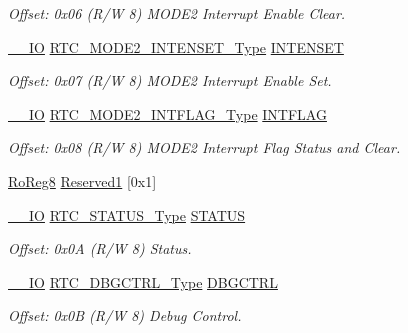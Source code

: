 \begin{DoxyCompactItemize}
\begin{DoxyCompactList}\small\item\em Offset\+: 0x06 (R/W 8) M\+O\+D\+E2 Interrupt Enable Clear. \end{DoxyCompactList}\item 
\mbox{\hyperlink{core__cm0plus_8h_aec43007d9998a0a0e01faede4133d6be}{\+\_\+\+\_\+\+IO}} \mbox{\hyperlink{union_r_t_c___m_o_d_e2___i_n_t_e_n_s_e_t___type}{R\+T\+C\+\_\+\+M\+O\+D\+E2\+\_\+\+I\+N\+T\+E\+N\+S\+E\+T\+\_\+\+Type}} \mbox{\hyperlink{struct_rtc_mode2_a80f57e7f64955acb2e16970997fa5d7f}{I\+N\+T\+E\+N\+S\+ET}}
\begin{DoxyCompactList}\small\item\em Offset\+: 0x07 (R/W 8) M\+O\+D\+E2 Interrupt Enable Set. \end{DoxyCompactList}\item 
\mbox{\hyperlink{core__cm0plus_8h_aec43007d9998a0a0e01faede4133d6be}{\+\_\+\+\_\+\+IO}} \mbox{\hyperlink{union_r_t_c___m_o_d_e2___i_n_t_f_l_a_g___type}{R\+T\+C\+\_\+\+M\+O\+D\+E2\+\_\+\+I\+N\+T\+F\+L\+A\+G\+\_\+\+Type}} \mbox{\hyperlink{struct_rtc_mode2_a98dc62afc11df4cca24babb393af06dc}{I\+N\+T\+F\+L\+AG}}
\begin{DoxyCompactList}\small\item\em Offset\+: 0x08 (R/W 8) M\+O\+D\+E2 Interrupt Flag Status and Clear. \end{DoxyCompactList}\item 
\mbox{\hyperlink{group___s_a_m_d21_e15_a__definitions_ga0d957f1433aaf5d70e4dc2b68288442d}{Ro\+Reg8}} \mbox{\hyperlink{struct_rtc_mode2_a092866123ac46d0985136e4dca2f36f4}{Reserved1}} \mbox{[}0x1\mbox{]}
\item 
\mbox{\hyperlink{core__cm0plus_8h_aec43007d9998a0a0e01faede4133d6be}{\+\_\+\+\_\+\+IO}} \mbox{\hyperlink{union_r_t_c___s_t_a_t_u_s___type}{R\+T\+C\+\_\+\+S\+T\+A\+T\+U\+S\+\_\+\+Type}} \mbox{\hyperlink{struct_rtc_mode2_a18fb82dd8352b8ac5b64e276ab0b5268}{S\+T\+A\+T\+US}}
\begin{DoxyCompactList}\small\item\em Offset\+: 0x0A (R/W 8) Status. \end{DoxyCompactList}\item 
\mbox{\hyperlink{core__cm0plus_8h_aec43007d9998a0a0e01faede4133d6be}{\+\_\+\+\_\+\+IO}} \mbox{\hyperlink{union_r_t_c___d_b_g_c_t_r_l___type}{R\+T\+C\+\_\+\+D\+B\+G\+C\+T\+R\+L\+\_\+\+Type}} \mbox{\hyperlink{struct_rtc_mode2_a291f72f633a731e348a16601bc63a11a}{D\+B\+G\+C\+T\+RL}}
\begin{DoxyCompactList}\small\item\em Offset\+: 0x0B (R/W 8) Debug Control. \end{DoxyCompactList}\item 

\end{DoxyCompactItemize}
